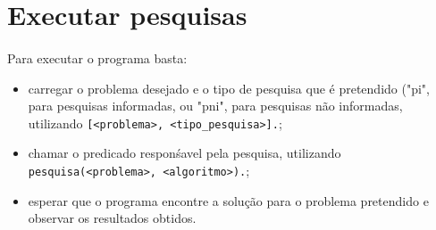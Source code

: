 \documentclass{article}
\begin{document}
 \newpage
 
\section{Executar pesquisas}
\paragraph{} Para executar o programa basta:
\begin{itemize}
  \item carregar o problema desejado e o tipo de pesquisa que é pretendido ("pi", para pesquisas informadas, ou "pni", para pesquisas não informadas, utilizando \texttt{[<problema>, <tipo\_pesquisa>].};
  \item chamar o predicado responśavel pela pesquisa, utilizando \texttt{pesquisa(<problema>, <algoritmo>).};
  \item esperar que o programa encontre a solução para o problema pretendido e observar os resultados obtidos.
\end{itemize}
\end{document}
